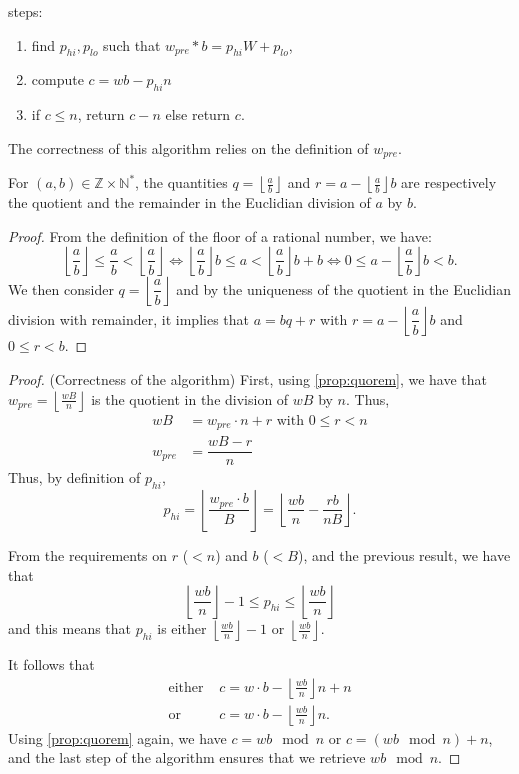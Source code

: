 \documentclass[a4paper]{article}
\begin{document}
steps:
\begin{enumerate}
    \item find $p_{hi}, p_{lo}$ such that $w_{pre} * b = p_{hi}W + p_{lo}$,
    \item compute $c = wb - p_{hi}n$
    \item if $c \leq n$, return $c-n$ else return $c$.
\end{enumerate}

The correctness of this algorithm relies on the definition of $w_{pre}$. 

\begin{proposition}\label{prop:quorem}
For $(a,b) \in \mathbb{Z}\times \mathbb{N}^*$, the quantities $q=\left\lfloor\frac{a}{b}\right\rfloor$ and $r=a - \left\lfloor\frac{a}{b}\right\rfloor b$ are respectively the quotient and the remainder in the Euclidian division of $a$ by $b$.
\end{proposition}
    
\begin{proof}
From the definition of the floor of a rational number, we have:
\[
    \left\lfloor\dfrac{a}{b}\right\rfloor \leq \dfrac{a}{b} < \left\lfloor\dfrac{a}{b}\right\rfloor \Longleftrightarrow
    \left\lfloor\dfrac{a}{b}\right\rfloor b \leq a < \left\lfloor\dfrac{a}{b}\right\rfloor b + b \Longleftrightarrow
    0 \leq a - \left\lfloor\dfrac{a}{b}\right\rfloor b < b.
\]
We then consider $q=\left\lfloor\dfrac{a}{b}\right\rfloor$ and by the uniqueness of the quotient in the Euclidian division with remainder, it implies that $a = bq + r$ with $r=a - \left\lfloor\dfrac{a}{b}\right\rfloor b$ and $0 \leq r < b$.
\end{proof}

\begin{proof} (Correctness of the algorithm)
First, using \autoref{prop:quorem}, we have that $w_{pre}= \left\lfloor\frac{wB}{n}\right\rfloor $ is the quotient in the division of $wB$ by $n$. Thus,
\begin{align*}
wB &= w_{pre}\cdot n + r \text{ with } 0 \leq r < n \\
w_{pre} &= \dfrac{wB - r}{n}
\end{align*}
Thus, by definition of $p_{hi}$,
\[
p_{hi} = \left\lfloor\frac{w_{pre}\cdot b}{B}\right\rfloor
= \left\lfloor\dfrac{wb}{n} - \dfrac{rb}{nB} \right\rfloor.
\]

From the requirements on $r$ ($<n$) and $b$ ($<B$), and the previous result, we have that
\[
\left\lfloor\dfrac{wb}{n}\right\rfloor - 1 \leq p_{hi} \leq \left\lfloor\dfrac{wb}{n}\right\rfloor
\]
and this means that $p_{hi}$ is either $\left\lfloor\frac{wb}{n}\right\rfloor - 1$ or $\left\lfloor\frac{wb}{n}\right\rfloor$.


It follows that 
\begin{align*}
\text{either } &c=w\cdot b - \left\lfloor\frac{wb}{n}\right\rfloor n + n \\
\text{or } &c=w\cdot b - \left\lfloor\frac{wb}{n}\right\rfloor n.
\end{align*}
Using \autoref{prop:quorem} again, we have $c=wb \mod n$ or $c=(wb \mod n)+n$, and the last step of the algorithm ensures that we retrieve $wb \mod n$.
\end{proof}
\end{document}

